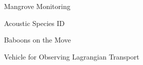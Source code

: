 \item Mangrove Monitoring
\item Acoustic Species ID
\item Baboons on the Move
\item Vehicle for Observing Lagrangian Transport
